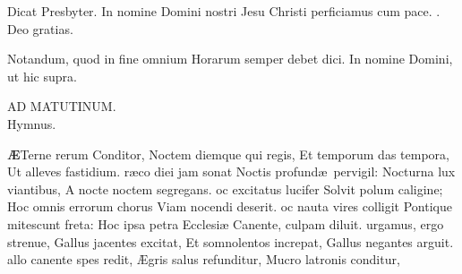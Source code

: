 \documentclass[letter,11pt]{book}
\makeatletter
\DeclareRobustCommand{\Rbar}{\vers@resp{0pt}{R}}
\newcommand{\vers@resp@sym}{\raisebox{0.2ex}{\rotatebox[origin=c]{-20}{$\m@th\rceil$}}}
\newcommand{\vers@resp}[2]{%
  {\ooalign{\hidewidth\kern#1\vers@resp@sym\hidewidth\cr#2\cr}}%
}%
\def\R{\color{Red} \Rbar . \color{black}}
\makeatother
\begin{document}
\begin{multicols}{2}
\newline \color{Red} Dicat Presbyter. \color{black} In nomine Domini nostri Jesu Christi perficiamus cum pace. \R Deo gratias.
\par \color{Red} Notandum, quod in fine omnium Horarum semper debet dici. \color{black} In nomine Domini, \color{Red} ut hic supra. \color{black}
\vspace{-.5em} \begin{center} \color{Red} \hypertarget{DOM-PRIMA-ADV-MAT}{AD MATUTINUM.}\\Hymnus. \end{center} \vspace{-.5em}
\lettrine[lines=2]{\bfseries \color{Red} \AE}{}Terne rerum Conditor,
\newline Noctem diemque qui regis,
\newline \indent Et temporum das tempora,
\newline \indent Ut alleves fastidium.
r\ae co diei jam sonat
\newline \indent Noctis profund\ae \ pervigil:
\newline \indent Nocturna lux viantibus,
\newline \indent A nocte noctem segregans.
oc excitatus lucifer
\newline \indent Solvit polum caligine;
\newline \indent Hoc omnis errorum chorus
\newline \indent Viam nocendi deserit.
oc nauta vires colligit
\newline \indent Pontique mitescunt freta:
\newline \indent Hoc ipsa petra Ecclesi\ae 
\newline \indent Canente, culpam diluit.
urgamus, ergo strenue,
\newline \indent Gallus jacentes excitat,
\newline \indent Et somnolentos increpat,
\newline \indent Gallus negantes arguit.
allo canente spes redit,
\newline \indent \AE gris salus refunditur,
\newline \indent Mucro latronis conditur,

\end{multicols}
\end{document}
